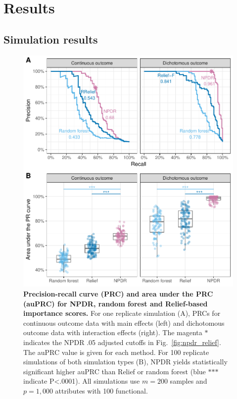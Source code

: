 \documentclass[10pt]{article}
\begin{document}

\section{Results}
\subsection{Simulation results} 

\begin{figure}[!tbp]
\centerline{\includegraphics[trim = 0 0 0 0]{../figs/fig2_pr_plots.pdf}}
\caption{{\bf Precision-recall curve (PRC) and area under the PRC (auPRC) for NPDR, random forest and Relief-based importance scores.} For one replicate simulation (A), PRCs for continuous outcome data with main effects (left) and dichotomous outcome data with interaction effects (right). The magenta $\ast$ indicates the NPDR .05 adjusted cutoffs in Fig.~\ref{fig:npdr_relief}. The auPRC value is given for each method. For 100 replicate simulations of both simulation types (B), NPDR yields statistically significant higher auPRC than Relief or random forest (blue $\ast$$\ast$$\ast$ indicate P<.0001). All simulations use $m = 200$ samples and $p = 1,000$ attributes with 100 functional. }
\label{fig:pr_curve}
\end{figure}
\end{document}
